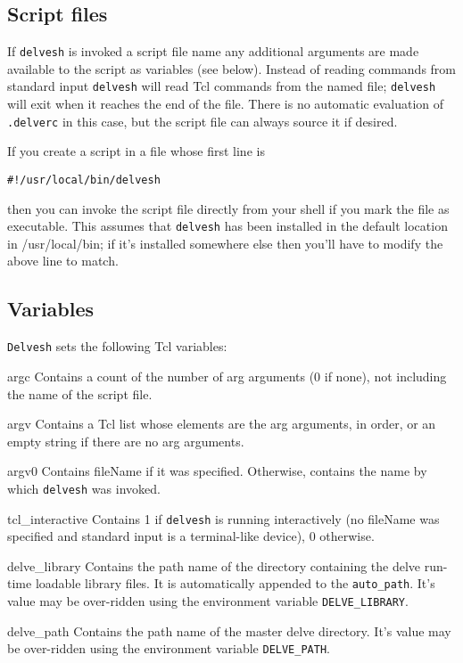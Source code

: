 \documentclass{article}
\newcommand{\delvesh}{\texttt{delvesh}}
\begin{document}
\subsection{Script files}
If \delvesh{} is invoked a script file name any additional arguments
are made available to the script as variables (see below). Instead of
reading commands from standard input \delvesh{} will read Tcl commands
from the named file; \delvesh{} will exit when it reaches the end of
the file.  There is no automatic evaluation of \texttt{.delverc} in
this case, but the script file can always source it if desired.

If you create a \delve{} script in a file whose first line is
\begin{centering}
\verb+#!/usr/local/bin/delvesh+
\end{centering}
then you can invoke the script file directly from your shell if you
mark the file as executable.  This assumes that \delvesh{} has been
installed in the default location in /usr/local/bin; if it's installed
somewhere else then you'll have to modify the above line to match.

\subsection{Variables}
\texttt{Delvesh} sets the following Tcl variables:
\begin{options}
\item[argc] 
    Contains a count of the number of arg arguments (0 if none), not
    including the name of the script file.
\item[argv]
    Contains a Tcl list whose elements are the arg arguments, in
    order, or an empty string if there are no arg arguments.
\item[argv0]
    Contains fileName if it was specified.  Otherwise, contains the
    name by which \delvesh{} was invoked.
\item[tcl\_interactive]
    Contains 1 if \delvesh{} is running interactively (no fileName was
    specified and standard input is a terminal-like device), 0
    otherwise.
\item[delve\_library]
    Contains the path name of the directory containing the delve
    run-time loadable library files.  It is automatically appended to
    the \texttt{auto\_path}.  It's value may be over-ridden using the
    environment variable \texttt{DELVE\_LIBRARY}.
\item[delve\_path]
    Contains the path name of the master delve directory. It's value
    may be over-ridden using the environment variable
    \texttt{DELVE\_PATH}.
\end{options}
\end{document}
